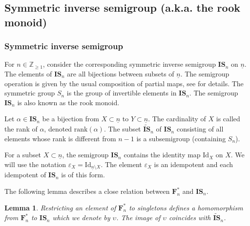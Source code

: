 \documentclass[a4paper]{amsart}
\newtheorem{lemma}[theorem]{Lemma}
\begin{document}
\subsection{Symmetric inverse semigroup (a.k.a. the rook monoid)}\label{s4.2}

\subsubsection{Symmetric inverse semigroup}\label{s4.2.1}

For $n\in\mathbb{Z}_{\geq 1}$, consider the corresponding symmetric inverse semigroup 
$\mathbf{IS}_n$ on $\underline{n}$. The elements of $\mathbf{IS}_n$ are all bijections
between subsets of $\underline{n}$. The semigroup operation is given 
by the usual composition of partial maps,
see \cite[Section~2.1]{GM} for details. The symmetric group $S_n$ is the group of invertible
elements in $\mathbf{IS}_n$. The semigroup $\mathbf{IS}_n$ is also known as the rook monoid.

Let $\alpha\in\mathbf{IS}_n$ be a bijection from $X\subset \underline{n}$ to $Y\subset \underline{n}$.
The cardinality of $X$ is called the rank of $\alpha$, denoted $\mathrm{rank}(\alpha)$. The subset
$\widetilde{\mathbf{IS}}_n$ of $\mathbf{IS}_n$ consisting of all elements whose rank is 
different from $n-1$ is a subsemigroup (containing $S_n$). 

For a subset $X\subset\underline{n}$, the semigroup $\mathbf{IS}_n$ contains the 
identity map $\mathrm{Id}_X$ on $X$. We will use the notation $\varepsilon_X=\mathrm{Id}_{\underline{n}\setminus X}$.  
The element $\varepsilon_X$ is an idempotent and each idempotent of $\mathbf{IS}_n$ is of this form. 

The following lemma describes a close relation between $\mathbf{F}^*_n$ and $\mathbf{IS}_n$.

\begin{lemma}\label{lem-isn-dual}
Restricting an element of $\mathbf{F}^*_n$ to singletons defines a homomorphism
from $\mathbf{F}^*_n$ to $\mathbf{IS}_n$ which we denote by ${\upsilon}$.
The image of ${\upsilon}$ coincides with $\widetilde{\mathbf{IS}}_n$.
\end{lemma}
\end{document}
